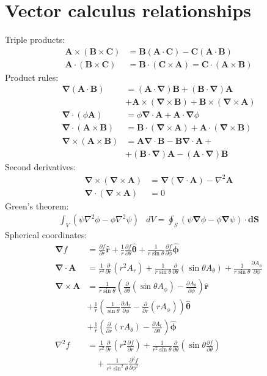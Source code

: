 \documentclass[10pt,twocolumn]{article}
\newcommand{\D}{\mathbf{\nabla}}
\newcommand{\A}{\mathbf{A}}
\newcommand{\B}{\mathbf{B}}
\newcommand{\C}{\mathbf{C}}
\newcommand{\dS}{\mathbf{dS}}
\newcommand{\laplacian}{\nabla^2}
\newcommand{\rhat}{\mathbf{\hat{r}}}
\newcommand{\thetahat}{\mathbf{\hat{\theta}}}
\newcommand{\phihat}{\mathbf{\hat{\phi}}}
\begin{document}
  \section{Vector calculus relationships}
  Triple products:
  \begin{align*}
    \A\times(\B\times\C) &= \B(\A\cdot\C) - \C(\A\cdot\B) \\
    \A\cdot(\B\times\C) &= \B\cdot(\C\times\A) = \C\cdot(\A\times\B)
  \end{align*}
  Product rules:
  \begin{align*}
    \D(\A\cdot\B) &= (\A\cdot\D)\B+(\B\cdot\D)\A \\
    &+\A\times(\D\times\B)+\B\times(\D\times\A) \\
    \D\cdot(\phi\A) &= \phi\D\cdot\A + \A\cdot\D\phi \\
    \D\cdot(\A\times\B) &= \B\cdot(\D\times\A) + \A\cdot(\D\times\B) \\
    \D\times(\A\times\B) &= \A\D\cdot\B - \B\D\cdot\A + \\
    &+ (\B\cdot\D)\A - (\A\cdot\D)\B
  \end{align*}
  Second derivatives:
  \begin{align*}
    \D\times(\D\times\A) &= \D(\D\cdot\A) - \laplacian\A \\
    \D\cdot(\D\times\A) &=0
  \end{align*}
  Green's theorem:
  \begin{align*}
    \int_V\left(\psi\laplacian\phi-\phi\laplacian\psi\right)&dV
    = \oint_S\left(\psi\D\phi - \phi\D\psi\right)\cdot\dS
  \end{align*}
  Spherical coordinates:
  \begin{align*}
    \D f &= \frac{\partial f}{\partial r}\rhat
    + \frac1r\frac{\partial f}{\partial\theta}\thetahat
    + \frac1{r\sin\theta}\frac{\partial f}{\partial\phi}\phihat \\
    \D\cdot\A &= \frac1{r^2}\frac{\partial}{\partial r}
          \left(r^2A_r\right)
    + \frac1{r\sin\theta}\frac{\partial}{\partial\theta}
          \left(\sin\theta A_\theta\right)
    + \frac1{r\sin\theta}\frac{\partial A_\phi}{\partial\phi} \\
    \D\times\A &=
    \frac1{r\sin\theta} \left(
         \frac{\partial}{\partial\theta}\left(\sin\theta A_\phi\right)
         - \frac{\partial A_\theta}{\partial\phi}
    \right) \rhat \\
    &+ \frac1r\left(
         \frac1{\sin\theta}\frac{\partial A_r}{\partial \phi}
         - \frac{\partial}{\partial r}\left(rA_\phi\right)
    \right)\thetahat \\
    &+ \frac1r\left(
         \frac{\partial}{\partial r}\left(rA_\theta\right)
         -\frac{\partial A_r}{\partial\theta}
    \right)\phihat
    \\
    \laplacian f &=
    \frac1{r^2}\frac{\partial}{\partial r}\left(r^2\frac{\partial
    f}{\partial r}\right)
    + \frac1{r^2\sin\theta}\frac{\partial}{\partial\theta}
      \left(\sin\theta\frac{\partial f}{\partial\theta}\right)\\
    &\quad+ \frac1{r^2\sin^2\theta}\frac{\partial^2f}{\partial\phi^2}
  \end{align*}
\end{document}
